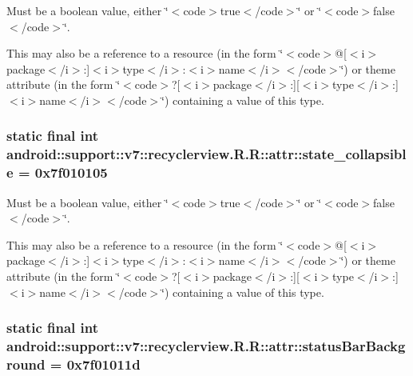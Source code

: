 Must be a boolean value, either \char`\"{}$<$code$>$true$<$/code$>$\char`\"{} or \char`\"{}$<$code$>$false$<$/code$>$\char`\"{}. 

This may also be a reference to a resource (in the form \char`\"{}$<$code$>$@\mbox{[}$<$i$>$package$<$/i$>$:\mbox{]}$<$i$>$type$<$/i$>$:$<$i$>$name$<$/i$>$$<$/code$>$\char`\"{}) or theme attribute (in the form \char`\"{}$<$code$>$?\mbox{[}$<$i$>$package$<$/i$>$:\mbox{]}\mbox{[}$<$i$>$type$<$/i$>$:\mbox{]}$<$i$>$name$<$/i$>$$<$/code$>$\char`\"{}) containing a value of this type. \hypertarget{classandroid_1_1support_1_1v7_1_1recyclerview_1_1_r_1_1attr_955a6e6b1d0d049e6bdf07261cd0baa8}{
\subsubsection[{state\_\-collapsible}]{\setlength{\rightskip}{0pt plus 5cm}static final int android::support::v7::recyclerview.R.R::attr::state\_\-collapsible = 0x7f010105}}
\label{classandroid_1_1support_1_1v7_1_1recyclerview_1_1_r_1_1attr_955a6e6b1d0d049e6bdf07261cd0baa8}


Must be a boolean value, either \char`\"{}$<$code$>$true$<$/code$>$\char`\"{} or \char`\"{}$<$code$>$false$<$/code$>$\char`\"{}. 

This may also be a reference to a resource (in the form \char`\"{}$<$code$>$@\mbox{[}$<$i$>$package$<$/i$>$:\mbox{]}$<$i$>$type$<$/i$>$:$<$i$>$name$<$/i$>$$<$/code$>$\char`\"{}) or theme attribute (in the form \char`\"{}$<$code$>$?\mbox{[}$<$i$>$package$<$/i$>$:\mbox{]}\mbox{[}$<$i$>$type$<$/i$>$:\mbox{]}$<$i$>$name$<$/i$>$$<$/code$>$\char`\"{}) containing a value of this type. \hypertarget{classandroid_1_1support_1_1v7_1_1recyclerview_1_1_r_1_1attr_963021ba4b2708d0c79a33c89a669b52}{
\subsubsection[{statusBarBackground}]{\setlength{\rightskip}{0pt plus 5cm}static final int android::support::v7::recyclerview.R.R::attr::statusBarBackground = 0x7f01011d}}
\label{classandroid_1_1support_1_1v7_1_1recyclerview_1_1_r_1_1attr_963021ba4b2708d0c79a33c89a669b52}



